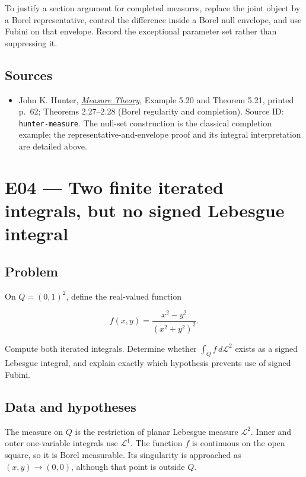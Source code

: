 \documentclass[
  11pt,
]{article}
\providecommand{\tightlist}{%
  \setlength{\itemsep}{0pt}\setlength{\parskip}{0pt}}
\begin{document}
To justify a section argument for completed measures, replace the joint
object by a Borel representative, control the difference inside a Borel
null envelope, and use Fubini on that envelope. Record the exceptional
parameter set rather than suppressing it.

\subsection{Sources}\label{sources-2}

\begin{itemize}
\tightlist
\item
  John K. Hunter,
  \href{https://www.math.ucdavis.edu/~hunter/measure_theory/measure_notes.pdf}{\emph{Measure
  Theory}}, Example 5.20 and Theorem 5.21, printed p.~62; Theorems
  2.27--2.28 (Borel regularity and completion). Source ID:
  \texttt{hunter-\allowbreak{}measure}. The null-set construction is the classical
  completion example; the representative-and-envelope proof and its
  integral interpretation are detailed above.
\end{itemize}

\section{E04 --- Two finite iterated integrals, but no signed Lebesgue
integral}\label{E04}

\subsection{Problem}\label{problem-3}

On \(Q=(0,1)^2\), define the real-valued function

\[
f(x,y)=\frac{x^2-y^2}{(x^2+y^2)^2}.
\]

Compute both iterated integrals. Determine whether
\(\int_Q f\,d\mathcal L^2\) exists as a signed Lebesgue integral, and
explain exactly which hypothesis prevents use of signed Fubini.

\subsection{Data and hypotheses}\label{data-and-hypotheses-3}

The measure on \(Q\) is the restriction of planar Lebesgue measure
\(\mathcal L^2\). Inner and outer one-variable integrals use
\(\mathcal L^1\). The function \(f\) is continuous on the open square,
so it is Borel measurable. Its singularity is approached as
\((x,y)\to(0,0)\), although that point is outside \(Q\).
\end{document}
